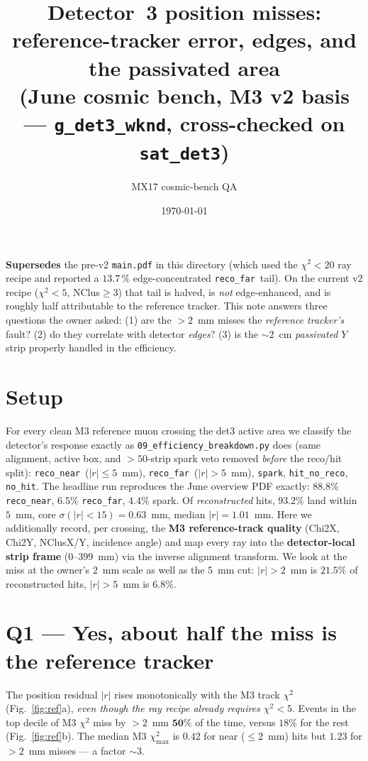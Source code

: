 \documentclass[11pt]{article}
\title{\vspace{-2.5em}Detector~3 position misses: reference-tracker error,
edges, and the passivated area\\
\large (June cosmic bench, \textbf{M3 v2} basis --- \texttt{g\_det3\_wknd}, cross-checked on \texttt{sat\_det3})}
\author{MX17 cosmic-bench QA}
\date{\today}
\newcommand{\reconear}{\texttt{reco\_near}}
\newcommand{\recofar}{\texttt{reco\_far}}
\begin{document}
\maketitle
\vspace{-1.5em}

\noindent\textbf{Supersedes} the pre-v2 \texttt{main.pdf} in this directory (which used the
$\chi^2<20$ ray recipe and reported a $13.7\,\%$ edge-concentrated \recofar\ tail). On the
current v2 recipe ($\chi^2<5$, NClus$\ge3$) that tail is halved, is \emph{not} edge-enhanced,
and is roughly half attributable to the reference tracker. This note answers three questions
the owner asked: (1) are the $>\!2$~mm misses the \emph{reference tracker's} fault?
(2) do they correlate with detector \emph{edges}? (3) is the $\sim2$~cm \emph{passivated} $Y$
strip properly handled in the efficiency.

\section{Setup}
For every clean M3 reference muon crossing the det3 active area we classify the detector's
response exactly as \texttt{09\_efficiency\_breakdown.py} does (same alignment, active box, and
$>\!50$-strip spark veto removed \emph{before} the reco/hit split): \reconear\ ($|r|\le5$~mm),
\recofar\ ($|r|>5$~mm), \texttt{spark}, \texttt{hit\_no\_reco}, \texttt{no\_hit}. The headline
run reproduces the June overview PDF exactly: $88.8\%$ \reconear, $6.5\%$ \recofar, $4.4\%$
spark. Of \emph{reconstructed} hits, $93.2\%$ land within $5$~mm, core $\sigma(|r|<15)=0.63$~mm,
median $|r|=1.01$~mm. Here we additionally record, per crossing, the \textbf{M3 reference-track
quality} (Chi2X, Chi2Y, NClusX/Y, incidence angle) and map every ray into the
\textbf{detector-local strip frame} ($0$--$399$~mm) via the inverse alignment transform.
We look at the miss at the owner's $2$~mm scale as well as the $5$~mm cut:
$|r|>2$~mm is $21.5\%$ of reconstructed hits, $|r|>5$~mm is $6.8\%$.

\section{Q1 --- Yes, about half the miss is the reference tracker}
The position residual $|r|$ rises monotonically with the M3 track $\chi^2$
(Fig.~\ref{fig:ref}a), \emph{even though the ray recipe already requires $\chi^2<5$}. Events in
the top decile of M3 $\chi^2$ miss by $>\!2$~mm $\mathbf{50\%}$ of the time, versus $18\%$ for
the rest (Fig.~\ref{fig:ref}b). The median M3 $\chi^2_{\max}$ is $0.42$ for near ($\le2$~mm)
hits but $1.23$ for $>\!2$~mm misses --- a factor $\sim3$.
\end{document}
